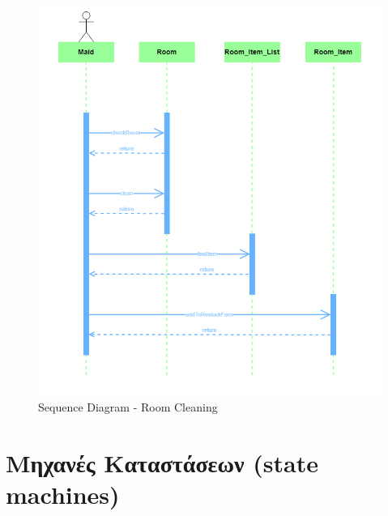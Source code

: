 \begin{figure}[H]
	\centering
	\includegraphics[width=1\textwidth]{Images/Sequence-Room cleaning}
	\caption{Sequence Diagram - Room Cleaning}
	\label{Sequence - Room Cleaning}
\end{figure}

\clearpage
\section{Μηχανές Καταστάσεων (state machines)}

